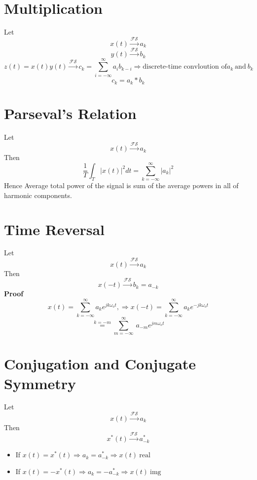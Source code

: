 \documentclass[11pt,a4paper]{article}
\theoremstyle{definition}
\begin{document}
\section{Multiplication}
Let 
\[
    x(t) \xrightarrow{\mathcal{F}\mathcal{S}} a_k
\]
\[
    y(t) \xrightarrow{\mathcal{F}\mathcal{S}} b_k
\]
\[
    z(t) = x(t)y(t) \xrightarrow{\mathcal{F}\mathcal{S}} c_k = \sum_{i=-\infty}^{\infty} a_ib_{k-i} \Rightarrow
    \text{discrete-time convloution of} a_k \ \text{and} \ b_k
\]
\[
    c_k = a_k * b_k
\]
\section{Parseval's Relation}
Let 
\[
    x(t) \xrightarrow{\mathcal{F}\mathcal{S}} a_k
\]
Then 
\[
    \boxed{\frac{1}{T} \int_T |x(t)|^2 dt = \sum_{k=-\infty}^{\infty}|a_k|^2 }
\]
Hence Average total power of the signal is sum of the average powers in all of harmonic components.
\section{Time Reversal}
Let 
\[
    x(t) \xrightarrow{\mathcal{F}\mathcal{S}} a_k
\]
Then 
\[
    x(-t) \xrightarrow{\mathcal{F}\mathcal{S}} b_k = a_{-k}
\]
\textbf{Proof}
\[  
    x(t) = \sum_{k=-\infty}^{\infty} a_k e^{jk\omega_ot}, \Longrightarrow x(-t)= \sum_{k=-\infty}^{\infty} a_k e^{-jk\omega_ot}
\]
\[
    \displaystyle \stackrel{k=-m}{=}  \sum_{m=-\infty}^{\infty} \ a_{-m} e^{jm\omega_ot}
\]

\section{Conjugation and Conjugate Symmetry}
Let 
\[
    x(t) \xrightarrow{\mathcal{F}\mathcal{S}} a_k
\]
Then 
\[
    x^*(t) \xrightarrow{\mathcal{F}\mathcal{S}} a^*_{-k}
\]
\begin{itemize}
    \item If $x(t) = x^*(t) \Rightarrow a_k = a^*_{-k}  \Longrightarrow  x(t) \ \text{real}$
    \item If $x(t) = -x^*(t) \Rightarrow a_k = -a^*_{-k}  \Longrightarrow  x(t) \ \text{img}$

\end{itemize}
\end{document}

